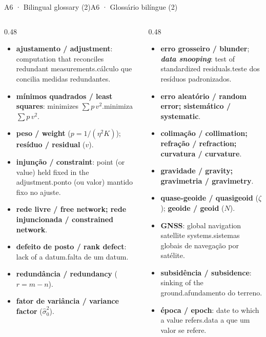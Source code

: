 \documentclass[aspectratio=169,11pt]{beamer}
\newcommand{\tr}[2]{\ifEN#2\else#1\fi}
\begin{document}
\begin{frame}{\tr{A6 · Glossário bilíngue (2)}{A6 · Bilingual glossary (2)}}
  \scriptsize
  \begin{columns}[onlytextwidth]
    \begin{column}{0.48\textwidth}
      \begin{itemize}
        \setlength{\itemsep}{2pt}
        \item \textbf{ajustamento / adjustment}: \tr{cálculo que concilia medidas redundantes.}{computation that reconciles redundant measurements.}
        \item \textbf{mínimos quadrados / least squares}: \tr{minimiza $\sum p\,v^{2}$.}{minimizes $\sum p\,v^{2}$.}
        \item \textbf{peso / weight} ($p=1/(\eta^{2}K)$); \textbf{resíduo / residual} ($v$).
        \item \textbf{injunção / constraint}: \tr{ponto (ou valor) mantido fixo no ajuste.}{point (or value) held fixed in the adjustment.}
        \item \textbf{rede livre / free network; rede injuncionada / constrained network}.
        \item \textbf{defeito de posto / rank defect}: \tr{falta de um datum.}{lack of a datum.}
        \item \textbf{redundância / redundancy} ($r=m-n$).
        \item \textbf{fator de variância / variance factor} ($\hat\sigma_0^{2}$).
      \end{itemize}
    \end{column}
    \begin{column}{0.48\textwidth}
      \begin{itemize}
        \setlength{\itemsep}{2pt}
        \item \textbf{erro grosseiro / blunder}; \textbf{\emph{data snooping}}: \tr{teste dos resíduos padronizados.}{test of standardized residuals.}
        \item \textbf{erro aleatório / random error; sistemático / systematic}.
        \item \textbf{colimação / collimation; refração / refraction; curvatura / curvature}.
        \item \textbf{gravidade / gravity; gravimetria / gravimetry}.
        \item \textbf{quase-geoide / quasigeoid} ($\zeta$); \textbf{geoide / geoid} ($N$).
        \item \textbf{GNSS}: \tr{sistemas globais de navegação por satélite.}{global navigation satellite systems.}
        \item \textbf{subsidência / subsidence}: \tr{afundamento do terreno.}{sinking of the ground.}
        \item \textbf{época / epoch}: \tr{data a que um valor se refere.}{date to which a value refers.}
      \end{itemize}
    \end{column}
  \end{columns}
\end{frame}
\end{document}
